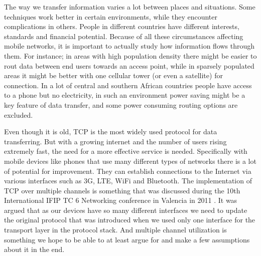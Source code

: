 \documentclass[11pt,twocolumn]{article}
\begin{document}
The way we transfer information varies a lot between places and situations. Some techniques work better in certain environments, while they encounter complications in others. People in different countries have different interests, standards and financial potential. Because of all these circumstances affecting mobile networks, it is important to actually study how information flows through them. For instance; in areas with high population density there might be easier to rout data between end users towards an access point, while in sparsely populated areas it might be better with one cellular tower (or even a satellite) for connection. In a lot of central and southern African countries people have access to a phone but no electricity, in such an environment power saving might be a key feature of data transfer, and some power consuming routing options are excluded.

Even though it is old, TCP is the most widely used protocol for data transferring. But with a growing internet and the number of users rising extremely fast, the need for a more effective service is needed. Specifically with mobile devices like phones that use many different types of networks there is a lot of potential for improvement. They can establish connections to the Internet via various interfaces such as 3G, LTE, WiFi and Bluetooth. The implementation of TCP over multiple channels is something that was discussed during the 10th International IFIP TC 6 Networking conference in Valencia in 2011 \cite{RFC6824}. It was argued that as our devices have so many different interfaces we need to update the original protocol that was introduced when we used only one interface for the transport layer in the protocol stack. And multiple channel utilization is something we hope to be able to at least argue for and make a few assumptions about it in the end.


\end{document}
